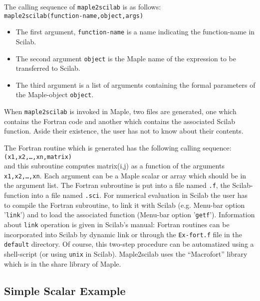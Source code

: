 The calling sequence of \verb!maple2scilab! is as follows:\\
\verb!maple2scilab(function-name,object,args)!
\begin{itemize}
\item
The first argument, \verb!function-name! is a name indicating the 
function-name in Scilab.
\item
The second argument \verb!object! is the Maple name of the expression 
to be transferred to Scilab.
\item
The third argument is a list of arguments containing the formal parameters of
the Maple-object \verb!object!.
\end{itemize}
When \verb!maple2scilab! is invoked in Maple, two files are generated,
one which contains the Fortran code and another which contains the 
associated Scilab function. Aside their existence, the user has not to
know about their contents.

The Fortran routine which is generated has the following calling sequence:\\
{\tt <Scilab-name>(x1,x2,\ldots,xn,matrix)} \\
and this subroutine computes matrix(i,j) as a function of
the arguments {\tt x1,x2,\ldots,xn}.
Each argument can be a Maple scalar or array which should be
in the argument list. 
The Fortran subroutine is put into a file named {\tt <Scilab-name>.f}, the
Scilab-function into a file named {\tt <Scilab-name>.sci}.
For numerical evaluation in Scilab the user has to compile the Fortran 
subroutine, to link it with Scilab (e.g. Menu-bar option '\verb!link!')
and to load the associated function (Menu-bar option '\verb!getf!').
Information about \verb!link! operation is given in Scilab's manual: 
Fortran routines can be incorporated into Scilab by dynamic
link or through the \verb!Ex-fort.f! file in the \verb!default! directory.
 Of course, this two-step procedure can be automatized using a shell-script 
(or using \verb!unix! in Scilab).
Maple2scilab uses the ``Macrofort'' library which is in the share 
library of Maple.
\subsection{Simple Scalar Example}
